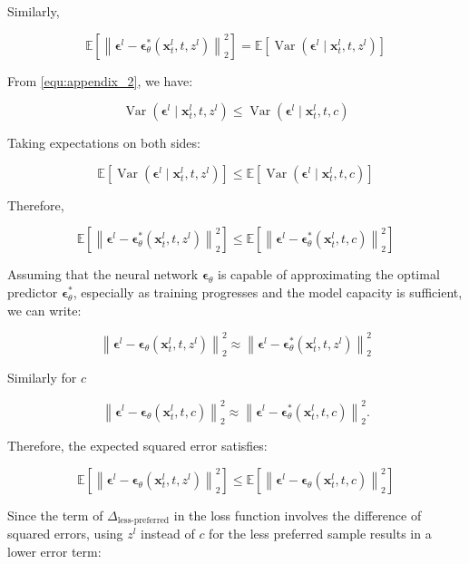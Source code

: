 Similarly,

$$
\mathbb{E}\left[ \left\| \boldsymbol{\epsilon}^l - \boldsymbol{\epsilon}_\theta^\ast(\mathbf{x}_t^l, t, z^l) \right\|_2^2 \right] = \mathbb{E}\left[ \operatorname{Var}\left( \boldsymbol{\epsilon}^l \mid \mathbf{x}_t^l, t, z^l \right) \right]
$$

From \ref{equ:appendix_2}, we have:

$$
\operatorname{Var}\left( \boldsymbol{\epsilon}^l \mid \mathbf{x}_t^l, t, z^l \right) \leq \operatorname{Var}\left( \boldsymbol{\epsilon}^l \mid \mathbf{x}_t^l, t, c \right)
$$

Taking expectations on both sides:

$$
\mathbb{E}\left[ \operatorname{Var}\left( \boldsymbol{\epsilon}^l \mid \mathbf{x}_t^l, t, z^l \right) \right] \leq \mathbb{E}\left[ \operatorname{Var}\left( \boldsymbol{\epsilon}^l \mid \mathbf{x}_t^l, t, c \right) \right]
$$

Therefore,

$$
\mathbb{E}\left[ \left\| \boldsymbol{\epsilon}^l - \boldsymbol{\epsilon}_\theta^\ast(\mathbf{x}_t^l, t, z^l) \right\|_2^2 \right] \leq \mathbb{E}\left[ \left\| \boldsymbol{\epsilon}^l - \boldsymbol{\epsilon}_\theta^\ast(\mathbf{x}_t^l, t, c) \right\|_2^2 \right]
$$

Assuming that the neural network $ \boldsymbol{\epsilon}_\theta $ is capable of approximating the optimal predictor $ \boldsymbol{\epsilon}_\theta^\ast $, especially as training progresses and the model capacity is sufficient, we can write:

$$
\left\| \boldsymbol{\epsilon}^l - \boldsymbol{\epsilon}_\theta(\mathbf{x}_t^l, t, z^l) \right\|_2^2 \approx \left\| \boldsymbol{\epsilon}^l - \boldsymbol{\epsilon}_\theta^\ast(\mathbf{x}_t^l, t, z^l) \right\|_2^2 
$$

Similarly for $ c $

$$
\left\| \boldsymbol{\epsilon}^l - \boldsymbol{\epsilon}_\theta(\mathbf{x}_t^l, t, c) \right\|_2^2 \approx \left\| \boldsymbol{\epsilon}^l - \boldsymbol{\epsilon}_\theta^\ast(\mathbf{x}_t^l, t, c) \right\|_2^2 .
$$

Therefore, the expected squared error satisfies:

$$
\mathbb{E}\left[ \left\| \boldsymbol{\epsilon}^l - \boldsymbol{\epsilon}_\theta(\mathbf{x}_t^l, t, z^l) \right\|_2^2 \right] \leq \mathbb{E}\left[ \left\| \boldsymbol{\epsilon}^l - \boldsymbol{\epsilon}_\theta(\mathbf{x}_t^l, t, c) \right\|_2^2 \right]
$$


Since the term of $ \Delta_{\text{less-preferred}} $ in the loss function involves the difference of squared errors, using $ z^l $ instead of $ c $ for the less preferred sample results in a lower error term:

